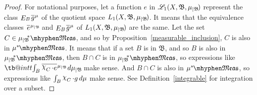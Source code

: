 \documentclass[
twoside=true,
paper=letter,
fontsize=9pt,
pagesize=auto,
leqno,
openany,
headsepline,
overfullrule,
]{scrbook}
\makeatletter
\theoremstyle{plain}
\theoremstyle{plain}
\theoremstyle{definition}
\theoremstyle{bfnoteitalic}
\theoremstyle{bfnoteroman}
\newcommand{\sigalg}[1]{\mathfrak{#1}}
\newcommand{\cali}[1]{\mathscr{#1}}
\newcommand{\kondexpsub}[2]
{\mathop{E}\nolimits_{#2}\hspace{-1pt}#1}
\newcommand{\charfunction}[1]{\mathop{{\raisebox{2pt}{$\chi$}}_{#1}}}
\newcommand{\restrictedto}[1]{_{\lvert#1}\kern-1.5pt}
\newcommand{\meets}{\cap}
\newcommand{\sigmaalgebraii}{\sigalg{B}}
\newcommand{\measurable}[1]{{#1}\mhyphen\mathfrak{Meas}}
\newcommand{\kernast}{\ast\kern-1pt}
\newcommand{\Psubstar}[1]{\measure\restrictedto{#1}\kern-2pt^*}
\newcommand{\functionii}{g}
\newcommand{\measurespace}{X}
\newcommand{\measure}{\mu}
\newcommand*\xbar[1]{%
   \hbox{%
     \vbox{%
       \hrule height 0.4pt %
       \kern0.4ex%
       \hbox{%
         \ensuremath{#1}%
       }%
     }%
   }%
}
\newcommand\tint{\mathop{\mathpalette\tb@int{t}}\!\int}
\newcommand\tb@int[2]{%
  \sbox\z@{$\m@th#1\int$}%
  \if#2t%
    \rlap{\hbox to\wd\z@{%
      \hfil
      \vrule width .35em height \dimexpr\ht\z@+1.4pt\relax depth -\dimexpr\ht\z@+1pt\relax
      \kern.05em %
    }}
  \else
    \rlap{\hbox to\wd\z@{%
      \vrule width .35em height -\dimexpr\dp\z@+1pt\relax depth \dimexpr\dp\z@+1.4pt\relax
      \hfil
    }}
  \fi
}
\newcommand{\lebclass}[1]{\hspace{.5pt}\xbar{#1}\hspace{0.5pt}}
\newcommand{\ellclass}[2]{\lebclass{#1}^{#2}}
\newcommand{\inducedint}{\tint}
\makeatother
\begin{document}
\begin{proof}
For notational purposes, let a function
$e$
in
$\cali{L}_1(\measurespace, \sigmaalgebraii,\measure\restrictedto{\sigmaalgebraii})$
represent the class 
$\kondexpsub{\ellclass{\functionii}{\measure}}{B}$
of the quotient space
$L_1(\measurespace, \sigmaalgebraii,\measure\restrictedto{\sigmaalgebraii})$.
It means that the equivalence classes
$\ellclass{e}{\measure\restrictedto{\sigmaalgebraii}}$
and
$\kondexpsub{\ellclass{\functionii}{\measure}}{B}$ of
$L_1(\measurespace, \sigmaalgebraii,\measure\restrictedto{\sigmaalgebraii})$
are the same.
Let the set
$C\in\measurable{\Psubstar{\sigmaalgebraii}}$,
and so by Proposition~\ref{measurable_inclusion}, $C$ is also in
$\measurable{\measure^\kernast}$.
It means that if a set $B$ is in
$\sigmaalgebraii$, and so $B$ is also in $\measurable{\Psubstar{\sigmaalgebraii}}$,
then
$B\meets C$ is in $\measurable{\Psubstar{\sigmaalgebraii}}$,
so expressions like
$\inducedint_B \ellclass{\charfunction{C}\cdot e}{\measure\restrictedto{\sigmaalgebraii}}\, d\measure\restrictedto{\sigmaalgebraii}$ make sense. And
$B\meets C$ is also in $\measurable{\measure^\kernast}$, so expressions like
$\int_B\charfunction{C} \cdot \functionii \, d\measure$ make sense.
See Definition~\ref{integrable} for integration over a subset.


\end{proof}
\end{document}
